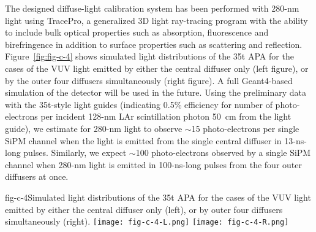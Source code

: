 The designed
diffuse-light calibration system has been performed with 280-nm light using TracePro, a generalized 3D
light ray-tracing program with the ability to include bulk optical
properties such as absorption, fluorescence and birefringence in addition
to surface properties such as scattering and
reflection. Figure~\ref{fig:fig-c-4} shows simulated light distributions
of the 35t APA for the cases of the VUV light emitted by either
the central diffuser only (left figure), or by the outer four diffusers
simultaneously (right figure). A full Geant4-based simulation of the
detector will be used in the future. Using the preliminary data with
the 35t-style light guides (indicating 0.5\% efficiency for number
of photo-electrons per incident 128-nm LAr scintillation photon 50~cm
from the light guide), we estimate for 280-nm light to observe $\sim$15
photo-electrons per single SiPM channel when the light is emitted from
the single central diffuser in 13-ns-long pulses. Similarly, we expect
$\sim$100 photo-electrons observed by a single SiPM channel when 280-nm light is emitted in 100-ns-long pulses from the four outer
diffusers at once.

%
\begin{cdrfigure}{fig-c-4}{Simulated light distributions of the 35t APA for the cases of the VUV light emitted by either the central diffuser only
  (left), or by outer four diffusers simultaneously (right).}
\texttt{[image: fig-c-4-L.png]}
\texttt{[image: fig-c-4-R.png]}
\end{cdrfigure}

